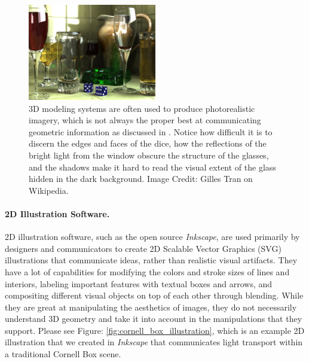 \documentclass[12pt, letterpaper]{article}
\begin{document}
	\begin{figure}[h]
	\centering
	\includegraphics[width=0.5\textwidth]{PhotorealisticRendering}
	\caption{3D modeling systems are often used to produce photorealistic imagery, which is not always the proper best at communicating geometric information as discussed in \cite{JDA08}.
		Notice how difficult it is to discern the edges and faces of the dice,
		how the reflections of the bright light from the window obscure the structure of the glasses, and the shadows make it hard to read the visual extent of the glass hidden in the dark background.
		Image Credit: Gilles Tran on Wikipedia.}
	\label{fig:photorealistic_rendering}
	\end{figure}

	\paragraph{2D Illustration Software.}

	2D illustration software, such as the open source \emph{Inkscape}, are used primarily by designers and communicators to create 2D Scalable Vector Graphics (SVG) illustrations that
	communicate ideas, rather than realistic visual artifacts. They have a lot of capabilities for modifying the colors and stroke sizes of lines and interiors,
	labeling important features with textual boxes and arrows, and compositing different visual objects on top of each other through blending.
	While they are great at manipulating the aesthetics of images, they do not necessarily understand 3D geometry and take it into account in the manipulations
	that they support. Please see Figure: \ref{fig:cornell_box_illustration}, which is an example 2D illustration that we created in \emph{Inkscape} that communicates light transport within a traditional Cornell Box scene.
\end{document}
